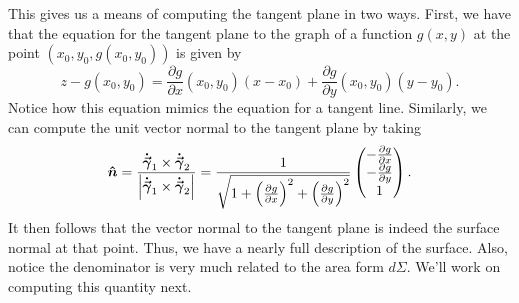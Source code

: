                                         This gives us a means of computing the tangent plane in two ways. First, we have that the equation for the tangent plane to the graph of a function $g(x,y)$ at the point $(x_0,y_0,g(x_0,y_0))$ is given by
                                        \[
                                        z-g(x_0,y_0)=\frac{\partial g}{\partial x}(x_0,y_0)(x-x_0)+\frac{\partial g}{\partial y}(x_0,y_0)(y-y_0).
                                        \]
                                        Notice how this equation mimics the equation for a tangent line.  Similarly, we can compute the unit vector normal to the tangent plane by taking
                                        \[
                                        \boldsymbol{\hat{n}} = \frac{\boldsymbol{\dot{\vec{\gamma}}}_1 \times \boldsymbol{\dot{\vec{\gamma}}}_2}{\left| \boldsymbol{\dot{\vec{\gamma}}}_1 \times \boldsymbol{\dot{\vec{\gamma}}}_2\right|} = \frac{1}{\sqrt{1+\left(\frac{\partial g}{\partial x}\right)^2 + \left(\frac{\partial g}{\partial y}\right)^2}} \begin{pmatrix} -\frac{\partial g}{\partial x} \\ -\frac{\partial g}{\partial y} \\ 1 \end{pmatrix}.
                                        \]
                                     	It then follows that the vector normal to the tangent plane is indeed the surface normal at that point.  Thus, we have a nearly full description of the surface. Also, notice the denominator is very much related to the area form $d\Sigma$.  We'll work on computing this quantity next.

